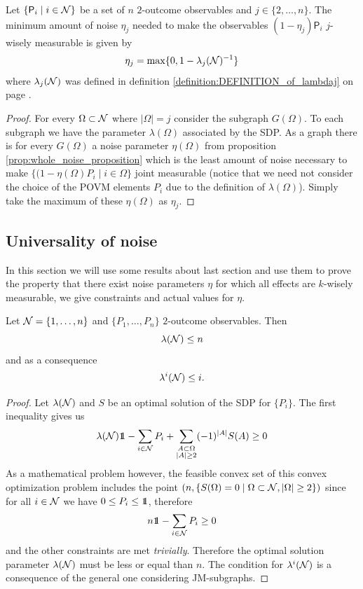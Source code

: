 \documentclass[10pt, a4paper]{amsart}
\begin{document}
\begin{corollary}\label{corollary:j_wisely_noise_proposition}
Let $\{\mathsf{P}_{i}\mid i\in \mathcal{N}\}$ be a set of $n$ $2$-outcome observables and $j\in \{2, \ldots , n\}$. The minimum amount of noise $\eta_{j}$ needed to make the observables $(1-\eta_{j})\mathsf{P}_{i}$ $j$-wisely measurable is given by 
$$
\eta_{j} = \max\{
0 , 1 - \lambda_{j}(\mathcal{N})^{-1}
\}
$$
where $\lambda_{j}(\mathcal{N})$ was defined in definition \ref{definition:DEFINITION_of_lambdaj} on page \pageref{definition:DEFINITION_of_lambdaj}. 
\end{corollary}
\begin{proof}
For every $\Omega \subset \mathcal{N}$ where $|\Omega| = j$ consider the subgraph $G(\Omega)$. To each subgraph we have the parameter $\lambda(\Omega ) $ associated by the SDP. As a graph there is for  every $G(\Omega)$ a noise parameter $\eta (\Omega)$ from proposition \ref{prop:whole_noise_proposition} which is the least amount of noise necessary to make $\{(1-\eta (\Omega) P_{i}  \mid i\in \Omega \}$ joint measurable (notice that we need not consider the choice of the POVM elements $P_{i}$ due to the definition of $\lambda(\Omega)$). Simply take the maximum of these $\eta (\Omega)$ as $\eta_{j}$.
\end{proof}



\newpage

\subsection{Universality of noise}
In this section we will use some results about last section and use them to prove the property that there exist noise parameters $\eta$ for which all 
effects are $k$-wisely measurable, we give constraints and actual values for $\eta$. 

 \begin{lemma}\label{lemma:Constraints_on_Lambdas}
 Let $\mathcal{N} = \{1, \ldots , n\}$ and $\{P_{1}, \ldots , P_{n}\}$ $2$-outcome observables. Then 
 $$\lambda (\mathcal{N}) \leq n$$
 and as a consequence 
 $$
\lambda^{i}(\mathcal{N}) \leq i. 
 $$
 \end{lemma}
 \begin{proof}
 Let $\lambda(\mathcal{N})$ and $S $ be an optimal solution of the SDP for $\{P_{i}\}$. The first inequality gives us 
 $$
\lambda(\N) \bbone  - \sum_{i\in \N}P_{i}+ \sum_{\substack{A\subset \Omega\\|A|\geq 2}}
(-1)^{|A|}
S(A)
\geq 0  
 $$
 As a mathematical problem however, the feasible convex set of this convex optimization problem includes the point $(n, \{S(\Omega) = 0\mid \Omega \subset \mathcal{N} , |\Omega| \geq 2\})$ since for all $i\in \mathcal{N}$ we have $0\leq P_{i}\leq \bbone$, therefore 
 $$
n \bbone - \sum_{i\in \N} P _{i} \geq 0 
 $$ 
 and the other constraints are met \textit{trivially}. Therefore the optimal solution parameter $\lambda ( \mathcal{N})$ must be less or equal than $n$. The  condition for $\lambda^{i}(\mathcal{N})$ is a consequence of the general one considering JM-subgraphs. 
 \end{proof}
 
\end{document}

